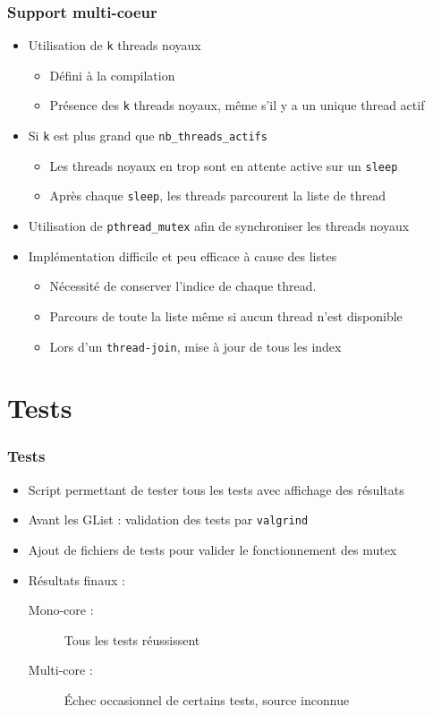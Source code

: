 \documentclass{beamer}
\begin{document}
\begin{frame}[containsverbatim]
  \frametitle{Support multi-coeur}
  \begin{itemize}
    \item Utilisation de \verb!k! threads noyaux
      \begin{itemize}
      \item Défini à la compilation
      \item Présence des \verb!k! threads noyaux, même s'il y a un unique
        thread actif
      \end{itemize}
    \item Si \verb!k! est plus grand que \verb!nb_threads_actifs!
      \begin{itemize}
        \item Les threads noyaux en trop sont en attente active sur un
          \verb!sleep!
        \item Après chaque \verb!sleep!, les threads parcourent la liste de
          thread
      \end{itemize}
    \item Utilisation de \verb!pthread_mutex! afin de synchroniser les
      threads noyaux
    \item Implémentation difficile et peu efficace à cause des listes
      \begin{itemize}
      \item Nécessité de conserver l'indice de chaque thread.
      \item Parcours de toute la liste même si aucun thread n'est disponible
      \item Lors d'un \verb!thread-join!, mise à jour de tous les index
      \end{itemize}
  \end{itemize}
\end{frame}

\section{Tests}

\begin{frame}[containsverbatim]
  \frametitle{Tests}
  \begin{itemize}
    \item Script permettant de tester tous les tests avec affichage des
      résultats
    \item Avant les GList : validation des tests par \verb!valgrind!
    \item Ajout de fichiers de tests pour valider le fonctionnement des mutex
    \item Résultats finaux :
      \begin{description}
        \item[Mono-core :] Tous les tests réussissent
        \item[Multi-core :] Échec occasionnel de certains tests, source
          inconnue
      \end{description}
  \end{itemize}
\end{frame}
\end{document}
